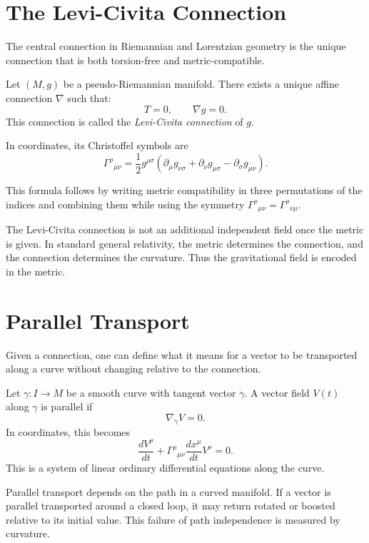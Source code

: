 \clearpage

\section{The Levi-Civita Connection}

The central connection in Riemannian and Lorentzian geometry is the unique
connection that is both torsion-free and metric-compatible.

\begin{theorembox}
Let \((M,g)\) be a pseudo-Riemannian manifold. There exists a unique affine
connection \(\nabla\) such that:
\[
T=0,
\qquad
\nabla g=0.
\]
This connection is called the \emph{Levi-Civita connection} of \(g\).
\end{theorembox}

In coordinates, its Christoffel symbols are
\[
\boxed{
\Gamma^\rho{}_{\mu\nu}
=\frac{1}{2}g^{\rho\sigma}
\left(
\partial_\mu g_{\nu\sigma}
+\partial_\nu g_{\mu\sigma}
-\partial_\sigma g_{\mu\nu}
\right).
}
\]

This formula follows by writing metric compatibility in three permutations of
the indices and combining them while using the symmetry
\(\Gamma^\rho{}_{\mu\nu}=\Gamma^\rho{}_{\nu\mu}\).

The Levi-Civita connection is not an additional independent field once the
metric is given. In standard general relativity, the metric determines the
connection, and the connection determines the curvature. Thus the gravitational
field is encoded in the metric.

\clearpage

\section{Parallel Transport}

Given a connection, one can define what it means for a vector to be transported
along a curve without changing relative to the connection.

Let \(\gamma:I\to M\) be a smooth curve with tangent vector \(\dot{\gamma}\). A
vector field \(V(t)\) along \(\gamma\) is parallel if
\[
\nabla_{\dot{\gamma}}V=0.
\]
In coordinates, this becomes
\[
\frac{dV^\rho}{dt}+\Gamma^\rho{}_{\mu\nu}
\frac{dx^\mu}{dt}V^\nu=0.
\]
This is a system of linear ordinary differential equations along the curve.

Parallel transport depends on the path in a curved manifold. If a vector is
parallel transported around a closed loop, it may return rotated or boosted
relative to its initial value. This failure of path independence is measured by
curvature.

